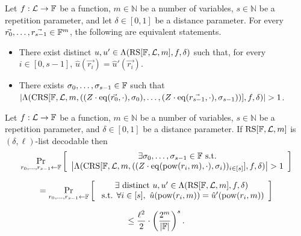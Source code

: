 \begin{lemma}
    Let $f : \mathcal{L} \rightarrow \mathbb{F}$ be a function, $m \in \mathbb{N}$ be a number of variables, $s \in \mathbb{N}$ be a repetition parameter, and let $\delta \in [0,1]$ be a distance parameter. For every $\vec{r_0}, \dots, \vec{r_{s-1}} \in \mathbb{F}^m$, the following are equivalent statements.
\begin{itemize}
    \item There exist distinct $u, u' \in \Lambda(\mathrm{RS}[\mathbb{F}, \mathcal{L}, m], f, \delta)$ such that, for every $i \in [0,s-1]$, $\hat{u}(\vec{r_i}) = \hat{u}'(\vec{r_i})$.
    \item There exists $\sigma_0, \dots, \sigma_{s-1} \in \mathbb{F}$ such that $\left| \Lambda(\mathrm{CRS}[\mathbb{F}, \mathcal{L}, m, ((Z \cdot \mathrm{eq}(\vec{r_0}, \cdot), \sigma_0), \dots, (Z \cdot \mathrm{eq}(\vec{r_{s-1}}, \cdot), \sigma_{s-1}))], f, \delta) \right| > 1$.
\end{itemize}
\end{lemma}

\begin{lemma}
    Let $f : \mathcal{L} \rightarrow \mathbb{F}$ be a function, $m \in \mathbb{N}$ be a number of variables, $s \in \mathbb{N}$ be a repetition parameter, and $\delta \in [0,1]$ be a distance parameter. If $\mathrm{RS}[\mathbb{F}, \mathcal{L}, m]$ is $(\delta, \ell)$-list decodable then
    \[
    \Pr_{r_0, \dots, r_{s-1} \leftarrow \mathbb{F}} \left[
    \begin{array}{c}
    \exists \sigma_0, \dots, \sigma_{s-1} \in \mathbb{F} \text{ s.t.} \\
    \left| \Lambda(\mathrm{CRS}[\mathbb{F}, \mathcal{L}, m, ((Z \cdot \mathrm{eq}(\mathrm{pow}(r_{i}, m), \cdot), \sigma_{i}))_{i \in [s]}], f, \delta) \right| > 1
    \end{array}
    \right]
    \]

    \[
    = \Pr_{r_0, \dots, r_{s-1} \leftarrow \mathbb{F}} \left[
    \begin{array}{c}
    \exists \text{ distinct } u, u' \in \Lambda(\mathrm{RS}[\mathbb{F}, \mathcal{L}, m], f, \delta) \\
    \text{ s.t. } \forall i \in [s],\ \hat{u}(\mathrm{pow}(r_i, m)) = \hat{u}'(\mathrm{pow}(r_i, m))
    \end{array}
    \right]
    \]

    \[
    \leq \frac{\ell^2}{2} \cdot \left( \frac{2^m}{|\mathbb{F}|} \right)^s.
    \]
\end{lemma}

